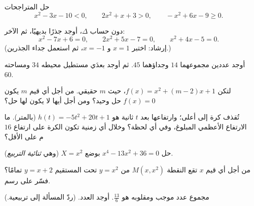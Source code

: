 \begin{exercise}[$\star$]\label{exo:g11:quad:3}
حل المتراجحات
\[
x^2 - 3x - 10 < 0, \qquad
2x^2 + x + 3 > 0, \qquad
-x^2 + 6x - 9 \geq 0 .
\]
\end{exercise}

\begin{exercise}[$\star$]\label{exo:g11:quad:4}
دون حساب $\Delta$، أوجد جذرًا بديهيًا، ثم  الآخر:
\[
x^2 - 7x + 6 = 0, \qquad
2x^2 + 5x - 7 = 0, \qquad
x^2 + 4x - 5 = 0 .
\]
(إرشاد: اختبر $x = 1$ و $x = -1$، ثم استعمل جداء الجذرين.)
\end{exercise}

\begin{exercise}[$\star\star$]\label{exo:g11:quad:5}
أوجد عددين مجموعهما $14$ وجداؤهما $45$. ثم أوجد
بعدَي مستطيل محيطه $34$ ومساحته $60$.
\end{exercise}

\begin{exercise}[$\star\star$]\label{exo:g11:quad:6}
لتكن $f(x) = x^2 + (m-2)x + 1$، حيث $m$  حقيقي. من أجل أي
قيم $m$ يكون  $f(x) = 0$ حل وحيد؟ ومن أجل أيها لا يكون
لها حل؟
\end{exercise}

\begin{exercise}[$\star\star$]\label{exo:g11:quad:7}
تُقذف كرة إلى أعلى؛ وارتفاعها بعد $t$ ثانية هو
$h(t) = -5t^2 + 20t + 1$ (بالمتر). ما الارتفاع الأعظمي المبلوغ،
وفي أي لحظة؟ وخلال أي  زمنية تكون الكرة على ارتفاع $16$ م
على الأقل؟
\end{exercise}

\begin{exercise}[$\star\star$]\label{exo:g11:quad:8}
حل  $x^4 - 13x^2 + 36 = 0$ بوضع $X = x^2$
(وهي  \emph{ثنائية التربيع}).
\end{exercise}

\begin{exercise}[$\star\star$]\label{exo:g11:quad:9}
من أجل أي قيم $x$ تقع النقطة $M(x, x^2)$ من  $y = x^2$
تحت المستقيم $y = x + 2$ تمامًا؟ فسّر على رسم.
\end{exercise}

\begin{exercise}[$\star\star$]\label{exo:g11:quad:10}
مجموع عدد موجب ومقلوبه هو $\frac{13}{6}$. أوجد
العدد. (ردّ المسألة إلى  تربيعية.)
\end{exercise}

